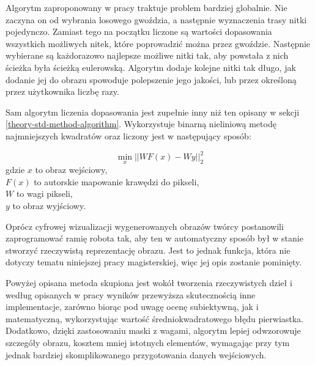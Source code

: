         Algorytm zaproponowany w pracy traktuje problem bardziej globalnie. Nie zaczyna on od wybrania losowego gwoździa, a następnie wyznaczenia trasy nitki pojedynczo. Zamiast tego na początku liczone są wartości dopasowania wszystkich możliwych nitek, które poprowadzić można przez gwoździe. Następnie wybierane są każdorazowo najlepsze możliwe nitki tak, aby powstała z nich ścieżka była ścieżką eulerowską. Algorytm dodaje kolejne nitki tak długo, jak dodanie jej do obrazu spowoduje polepszenie jego jakości, lub przez określoną przez użytkownika liczbę razy.
        
        Sam algorytm liczenia dopasowania jest zupełnie inny niż ten opisany w sekcji \ref{theory-std-method-algorithm}. Wykorzystuje binarną nieliniową metodę najmniejszych kwadratów oraz liczony jest w następujący sposób:
        
        \begin{equation} \label{others-birsak-penalty}
            \min_x ||WF(x) - Wy||_2^2
        \end{equation}
        gdzie \(x\) to obraz wejściowy,\\
        \(F(x)\) to autorskie mapowanie krawędzi do pikseli,\\
        \(W\) to wagi pikseli, \\
        \(y\) to obraz wyjściowy.
        
        Oprócz cyfrowej wizualizacji wygenerowanych obrazów twórcy postanowili zaprogramować ramię robota tak, aby ten w automatyczny sposób był w stanie stworzyć rzeczywistą reprezentację obrazu. Jest to jednak funkcja, która nie dotyczy tematu niniejszej pracy magisterskiej, więc jej opis zostanie pominięty. 

        Powyżej opisana metoda skupiona jest wokół tworzenia rzeczywistych dzieł i według opisanych w pracy wyników przewyższa skutecznością inne implementacje, zarówno biorąc pod uwagę ocenę subiektywną, jak i matematyczną, wykorzystując wartość średniokwadratowego błędu pierwiastka. Dodatkowo, dzięki zastosowaniu maski z wagami, algorytm lepiej odwzorowuje szczegóły obrazu, kosztem mniej istotnych elementów, wymagając przy tym jednak bardziej skomplikowanego przygotowania danych wejściowych.
        
